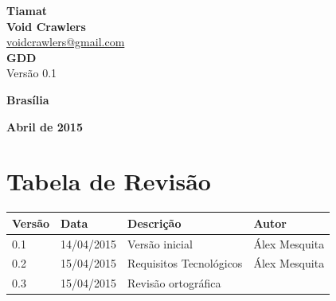 \documentclass[11pt]{article} %
\begin{document}
\begin{titlepage}
 \vfill
  \begin{center}
   {\large \textbf{Tiamat}} \\
   {\large \textbf{Void Crawlers}}\\
   {\large \href{mailto:voidcrawlers@gmail.com}{voidcrawlers@gmail.com}}\\[6cm]


   {\Large \textbf{GDD}}\\
   {\Large Versão 0.1}\\[6cm]

   \hspace{.45\textwidth} %
  \vfill

\vspace{2cm}

\large \textbf{Brasília}

\large \textbf{Abril de 2015}
\end{center}
\end{titlepage}
\newpage

\tableofcontents

\newpage


\section{Tabela de Revisão}


\begin{table}[h]
\begin{tabular}{|l|l|p{60mm}|l|}

\hline
\textbf{Versão}     & \textbf{Data}     & \textbf{Descrição}                                & \textbf{Autor}    \\ \hline
0.1                 & 14/04/2015        & Versão inicial                                    & Álex Mesquita     \\ \hline
0.2                 & 15/04/2015        & Requisitos Tecnológicos                           & Álex Mesquita     \\ \hline
0.3                 & 15/04/2015        & Revisão ortográfica                                                   &                   \\ \hline
\end{tabular}
\end{table}
\end{document}
